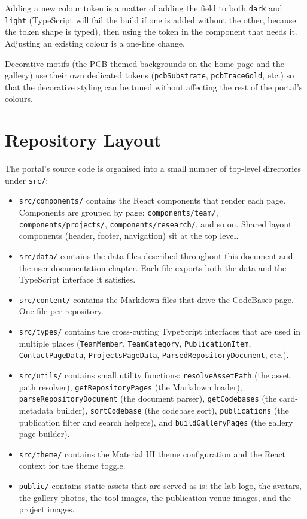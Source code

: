 Adding a new colour token is a matter of adding the field to both \texttt{dark} and \texttt{light} (TypeScript will fail the build if one is added without the other, because the token shape is typed), then using the token in the component that needs it. Adjusting an existing colour is a one-line change.

Decorative motifs (the PCB-themed backgrounds on the home page and the gallery) use their own dedicated tokens (\texttt{pcbSubstrate}, \texttt{pcbTraceGold}, etc.) so that the decorative styling can be tuned without affecting the rest of the portal's colours.

\section{Repository Layout}\label{sec:dev-layout}

The portal's source code is organised into a small number of top-level directories under \texttt{src/}:

\begin{itemize}
	\item \texttt{src/components/} contains the React components that render each page. Components are grouped by page: \texttt{components/team/}, \texttt{components/projects/}, \texttt{components/research/}, and so on. Shared layout components (header, footer, navigation) sit at the top level.
	\item \texttt{src/data/} contains the data files described throughout this document and the user documentation chapter. Each file exports both the data and the TypeScript interface it satisfies.
	\item \texttt{src/content/} contains the Markdown files that drive the CodeBases page. One file per repository.
	\item \texttt{src/types/} contains the cross-cutting TypeScript interfaces that are used in multiple places (\texttt{TeamMember}, \texttt{TeamCategory}, \texttt{PublicationItem}, \texttt{ContactPageData}, \texttt{ProjectsPageData}, \texttt{ParsedRepositoryDocument}, etc.).
	\item \texttt{src/utils/} contains small utility functions: \texttt{resolveAssetPath} (the asset path resolver), \texttt{getRepositoryPages} (the Markdown loader), \texttt{parseRepositoryDocument} (the document parser), \texttt{getCodebases} (the card-metadata builder), \texttt{sortCodebase} (the codebase sort), \texttt{publications} (the publication filter and search helpers), and \texttt{buildGalleryPages} (the gallery page builder).
	\item \texttt{src/theme/} contains the Material UI theme configuration and the React context for the theme toggle.
	\item \texttt{public/} contains static assets that are served as-is: the lab logo, the avatars, the gallery photos, the tool images, the publication venue images, and the project images.
\end{itemize}

